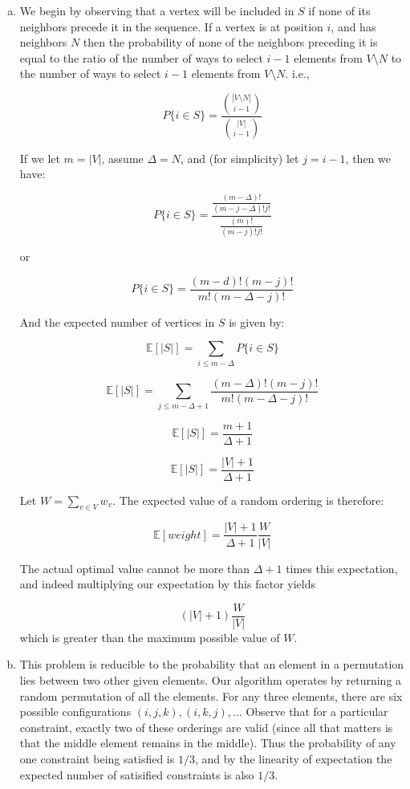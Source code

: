 \documentclass{article}[12pt]
\begin{document}
\begin{enumerate}[(a)]
\item We begin by observing that a vertex will be included in $S$ if none of its neighbors precede it in the sequence. If a vertex is at position $i$, and has neighbors $N$ then the probability of none of the neighbors preceding it is equal to the ratio of the number of ways to select $i-1$ elements from $V \setminus N$ to the number of ways to select $i-1$ elements from $V \setminus N$. i.e., 

$$P\{i \in S\}=\frac{{|V \setminus N| \choose i-1}}{{|V| \choose i-1}}$$

If we let $m=|V|$, assume $\Delta = N$, and (for simplicity) let $j=i-1$, then we have: 

$$P\{i \in S\}=\frac{\frac{(m-\Delta)!}{(m-j-\Delta)!j!}}{\frac{(m)!}{(m-j)!j!}}$$

or 

$$P\{i \in S\} =\frac{(m-d)! (m-j)!}{m! (m-\Delta-j)!}$$

And the expected number of vertices in $S$ is given by:

$$\mathds{E}[|S|] = \sum_{i \leq m-\Delta}P\{i \in S\}$$

$$\mathds{E}[|S|] = \sum_{j \leq m-\Delta+1}\frac{(m-\Delta)! (m-j)!}{m! (m-\Delta-j)!}$$

$$\mathds{E}[|S|] = \frac{m+1}{\Delta+1}$$

$$\mathds{E}[|S|] = \frac{|V|+1}{\Delta+1}$$

Let $W=\sum_{v \in V} w_v$. The expected value of a random ordering is therefore:

$$\mathds{E}[weight]=\frac{|V|+1}{\Delta+1}\frac{W}{|V|}$$

The actual optimal value cannot be more than $\Delta + 1$ times this expectation, and indeed multiplying our expectation by this factor yields 

$$(|V|+1)\frac{W}{|V|}$$ which is greater than the maximum possible value of $W$. 

\item This problem is reducible to the probability that an element in a permutation lies between two other given elements. Our algorithm operates by returning a random permutation of all the elements. For any three elements, there are six possible configurations $(i,j,k),(i,k,j),...$ Observe that for a particular constraint, exactly two of these orderings are valid (since all that matters is that the middle element remains in the middle). Thus the probability of any one constraint being satisfied is $1/3$, and by the linearity of expectation the expected number of satisified constraints is also $1/3$. 
\end{enumerate}
\end{document}
